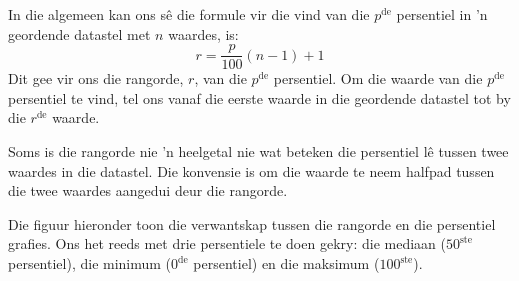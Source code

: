 In die algemeen kan ons sê die formule vir die vind van die $p^{\mathrm{de}}$ persentiel in ’n geordende datastel met $n$ waardes, is: 
\begin{equation*}
  r = \frac{p}{100}\left(n-1\right)+1
\end{equation*}
Dit gee vir ons die rangorde, $r$, van die $p^{\mathrm{de}}$ persentiel. Om die waarde van die $p^{\mathrm{de}}$ persentiel te vind, tel ons vanaf die eerste waarde in die geordende datastel tot by die $r^{\mathrm{de}}$ waarde.

Soms is die rangorde nie ’n heelgetal nie wat beteken die persentiel lê tussen twee waardes in die datastel. Die konvensie is om die waarde te neem halfpad tussen die twee waardes aangedui deur die rangorde.

 Die figuur hieronder toon die verwantskap tussen die rangorde en die persentiel grafies. Ons het reeds met drie persentiele te doen gekry: die mediaan ($50^{\mathrm{ste}}$ persentiel), die minimum ($0^{\mathrm{de}}$ persentiel) en die maksimum ($100^{\mathrm{ste}}$).
\begin{center}
\end{center}



